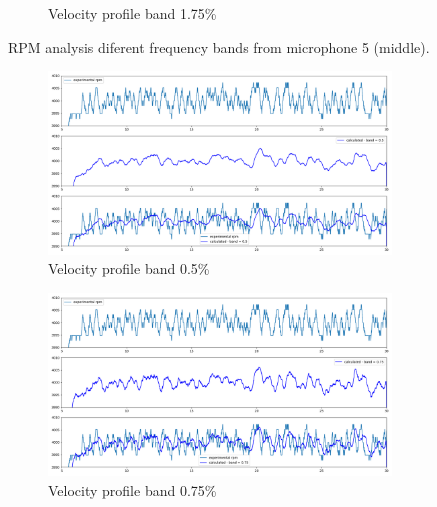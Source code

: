 \documentclass[10pt,fleqn,a4paper,twoside]{article}
\begin{document}
\begin{figure}[H]
\begin{subfigure}{0.4\textwidth}
            \caption{Velocity profile band 1.75\%}
            \label{fig:seventh}
        \end{subfigure}   
        \caption{RPM analysis diferent frequency bands from microphone 5 (middle).}
        \label{fig:figures}
        \end{figure}

    \newpage
    \begin{figure}[H] 
        
        
        \centering
        \begin{subfigure}{0.4\textwidth}
            \includegraphics[width=\textwidth]{Figures/rpm_analysis_mic8_band_0.5.png}
            \caption{Velocity profile band 0.5\%}
            \label{fig:second}
        \end{subfigure}
        \hfill
        \centering
        \begin{subfigure}{0.4\textwidth}
            \includegraphics[width=\textwidth]{Figures/rpm_analysis_mic8_band_0.75.png}
            \caption{Velocity profile band 0.75\%}
            \label{fig:third}
        \end{subfigure}
        \centering
        \hfill
        \begin{subfigure}{0.4\textwidth}

\end{subfigure}
\end{figure}
\end{document}
